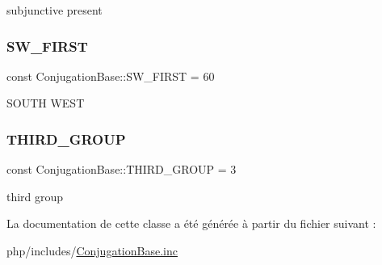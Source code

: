 subjunctive present \hypertarget{classConjugationBase_aadfcc5e449ab900e86244bcfdd8add79}{}\label{classConjugationBase_aadfcc5e449ab900e86244bcfdd8add79} 
\subsubsection{\texorpdfstring{S\+W\+\_\+\+F\+I\+R\+ST}{SW\_FIRST}}
{\footnotesize\ttfamily const Conjugation\+Base\+::\+S\+W\+\_\+\+F\+I\+R\+ST = 60}

S\+O\+U\+TH W\+E\+ST \hypertarget{classConjugationBase_a15fb84852952c270f80139517000d263}{}\label{classConjugationBase_a15fb84852952c270f80139517000d263} 
\subsubsection{\texorpdfstring{T\+H\+I\+R\+D\+\_\+\+G\+R\+O\+UP}{THIRD\_GROUP}}
{\footnotesize\ttfamily const Conjugation\+Base\+::\+T\+H\+I\+R\+D\+\_\+\+G\+R\+O\+UP = 3}

third group 

La documentation de cette classe a été générée à partir du fichier suivant \+:\begin{DoxyCompactItemize}
\item 
php/includes/\hyperlink{ConjugationBase_8inc}{Conjugation\+Base.\+inc}\end{DoxyCompactItemize}
